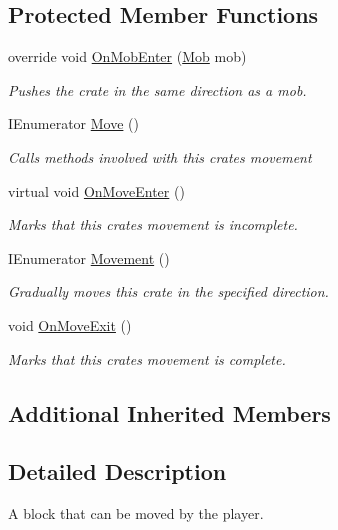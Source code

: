 \subsection*{Protected Member Functions}
\begin{DoxyCompactItemize}
\item 
override void \mbox{\hyperlink{class_crate_a31ad15231807013089177c2c4dc9ac0e}{On\+Mob\+Enter}} (\mbox{\hyperlink{class_mob}{Mob}} mob)
\begin{DoxyCompactList}\small\item\em Pushes the crate in the same direction as a mob. \end{DoxyCompactList}\item 
I\+Enumerator \mbox{\hyperlink{class_crate_ada60ced25b7e3edb1fc121a2f1ab6591}{Move}} ()
\begin{DoxyCompactList}\small\item\em Calls methods involved with this crate\textquotesingle{}s movement \end{DoxyCompactList}\item 
virtual void \mbox{\hyperlink{class_crate_a62c69318065c0cd28b018cce05ff279c}{On\+Move\+Enter}} ()
\begin{DoxyCompactList}\small\item\em Marks that this crate\textquotesingle{}s movement is incomplete. \end{DoxyCompactList}\item 
I\+Enumerator \mbox{\hyperlink{class_crate_af23a671cf3d73990939b70933e6e7578}{Movement}} ()
\begin{DoxyCompactList}\small\item\em Gradually moves this crate in the specified direction. \end{DoxyCompactList}\item 
void \mbox{\hyperlink{class_crate_ad4fe1232707b8bb92c6587bf759d4182}{On\+Move\+Exit}} ()
\begin{DoxyCompactList}\small\item\em Marks that this crate\textquotesingle{}s movement is complete. \end{DoxyCompactList}\end{DoxyCompactItemize}
\subsection*{Additional Inherited Members}


\subsection{Detailed Description}
A block that can be moved by the player. 

